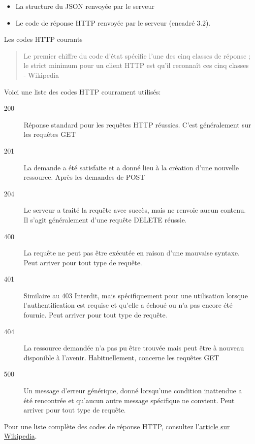\documentclass[]{report}
\begin{document}
    \begin{itemize}
      \item La structure du JSON renvoyée par le serveur
      \item Le code de réponse HTTP renvoyée par le serveur (encadré 3.2).
    \end{itemize}

    \begin{tcolorbox}{Les codes HTTP courants}\label{box:common_http_code}
      \begin{quote}
        Le premier chiffre du code d'état spécifie l'une des cinq classes de réponse ; le strict minimum pour un client HTTP est qu'il reconnaît ces cinq classes - Wikipedia
      \end{quote}

      Voici une liste des codes HTTP courrament utilisés:

      \begin{description}
        \item[200] Réponse standard pour les requêtes HTTP réussies. C'est généralement sur les requêtes GET
        \item[201] La demande a été satisfaite et a donné lieu à la création d'une nouvelle ressource. Après les demandes de POST
        \item[204] Le serveur a traité la requête avec succès, mais ne renvoie aucun contenu. Il s'agit généralement d'une requête DELETE réussie.
        \item[400] La requête ne peut pas être exécutée en raison d'une mauvaise syntaxe. Peut arriver pour tout type de requête.
        \item[401] Similaire au 403 Interdit, mais spécifiquement pour une utilisation lorsque l'authentification est requise et qu'elle a échoué ou n'a pas encore été fournie. Peut arriver pour tout type de requête.
        \item[404] La ressource demandée n'a pas pu être trouvée mais peut être à nouveau disponible à l'avenir. Habituellement, concerne les requêtes GET
        \item[500] Un message d'erreur générique, donné lorsqu'une condition inattendue a été rencontrée et qu'aucun autre message spécifique ne convient. Peut arriver pour tout type de requête.
      \end{description}


      Pour une liste complète des codes de réponse HTTP, consultez l'\href{https://fr.wikipedia.org/wiki/Liste_des_codes_HTTP}{article sur Wikipedia}.
    \end{tcolorbox}
\end{document}
